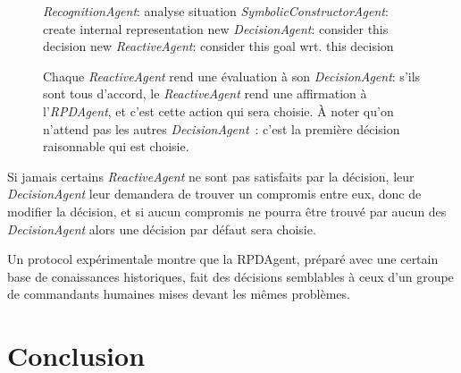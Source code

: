 \documentclass{article}
\begin{document}
\begin{figure}[H]
\begin{minipage}[H]{0.55\linewidth}
\begin{algorithmic}[1]
\STATE \emph{RecognitionAgent}: analyse situation
\STATE \emph{SymbolicConstructorAgent}: create internal representation
\STATE new \emph{DecisionAgent}: consider this decision
\STATE new \emph{ReactiveAgent}: consider this goal wrt. this decision
\ENDFOR
\ENDFOR
\end{algorithmic}
Chaque \emph{ReactiveAgent} rend une évaluation à son \emph{DecisionAgent}: s'ils sont tous d'accord, le \emph{ReactiveAgent} rend une affirmation à l'\emph{RPDAgent}, et c'est cette action qui sera choisie. À noter qu'on n'attend pas les autres \emph{DecisionAgent}~: c'est la première décision raisonnable qui est choisie.
\end{minipage}
\end{figure}
\cite{sokolowski2003}
Si jamais certains \emph{ReactiveAgent} ne sont pas satisfaits par la décision, leur \emph{DecisionAgent} leur demandera de trouver un compromis entre eux, donc de modifier la décision, et si aucun compromis ne pourra être trouvé par aucun des \emph{DecisionAgent} alors une décision par défaut sera choisie.

Un protocol expérimentale montre que la RPDAgent, préparé avec une certain base de conaissances historiques, fait des décisions semblables à ceux d'un groupe de commandants humaines mises devant les mêmes problèmes. 


\section{Conclusion}


\newpage


\end{document}
